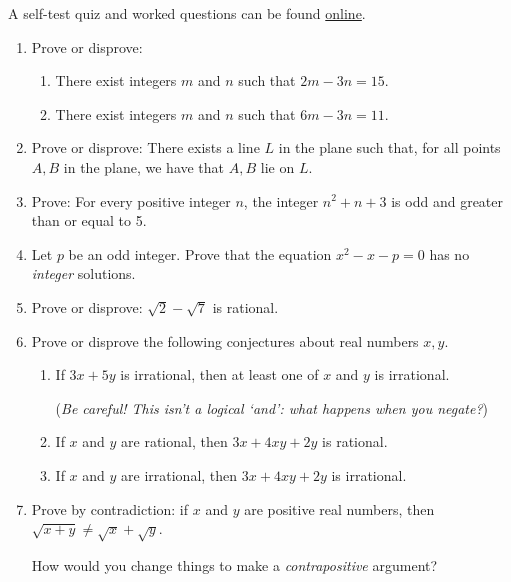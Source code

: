 \begin{exercises}{}{}
	A self-test quiz and worked questions can be found \href{http://www.math.uci.edu/~ndonalds/math13/selftest/2-4-proofs2.html}{online}.

	\begin{enumerate}
		\item Prove or disprove:
		\begin{enumerate}
		  \item There exist integers $m$ and $n$ such that $2m-3n=15$. 
		  
			\item There exist integers $m$ and $n$ such that $6m-3n=11$. 
	  \end{enumerate}
	   
	   
	  \item Prove or disprove: There exists a line $L$ in the plane such that, for all points $A,B$ in the plane, we have that $A,B$ lie on $L$. 
	   
	   
		\item Prove: For every positive integer $n$, the integer $n^2+n+3$ is odd and greater than or equal to 5.
		
	
		\item Let $p$ be an odd integer. Prove that the equation $x^2-x-p=0$ has no \emph{integer} solutions.
		
		
		\item Prove or disprove: $\sqrt 2-\sqrt 7$ is rational.
	   
	   
		\item Prove or disprove the following conjectures about real numbers $x,y$.
		\begin{enumerate}
		  \item If $3x+5y$ is irrational, then at least one of $x$ and $y$ is irrational.\par
		  (\emph{Be careful! This isn't a logical `and': what happens when you negate?})
		  
		  \item If $x$ and $y$ are rational, then $3x+4xy+2y$ is rational.
		  
		  \item If $x$ and $y$ are irrational, then $3x+4xy+2y$ is irrational.
		\end{enumerate}
	  
	  
		\item Prove by contradiction: if $x$ and $y$ are positive real numbers, then $\sqrt{x+y}\neq\sqrt{x}+\sqrt{y}$.\par
		How would you change things to make a \emph{contrapositive} argument?
	

\end{enumerate}
\end{exercises}
